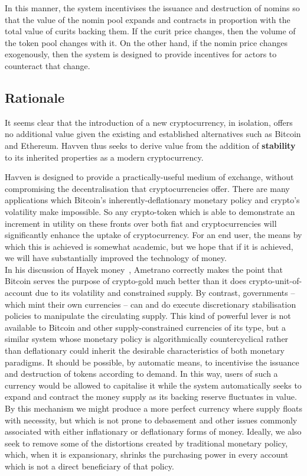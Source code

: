 In this manner, the system incentivises the issuance and destruction of nomins so that the value of
the nomin pool expands and contracts in proportion with the total value of curits backing them.
If the curit price changes, then the volume of the token pool changes with it.
On the other hand, if the nomin price changes exogenously, then the system is designed to provide
incentives for actors to counteract that change. \\

\subsection{Rationale}

It seems clear that the introduction of a new cryptocurrency, in isolation, offers no additional value given
the existing and established alternatives such as Bitcoin and Ethereum.
Havven thus seeks to derive value from the addition of \textbf{stability}
to its inherited properties as a modern cryptocurrency.

Havven is designed to provide a practically-useful medium of exchange, without compromising
the decentralisation that cryptocurrencies offer.
There are many applications which Bitcoin's inherently-deflationary monetary policy and
crypto's volatility make impossible. So any crypto-token which is able to demonstrate an increment
in utility on these fronts over both fiat and cryptocurrencies will significantly
enhance the uptake of cryptocurrency. 
For an end user, the means by which this is achieved is somewhat academic,
but we hope that if it is achieved, we will have substantially improved the technology of money. \\

\noindent  In his discussion of Hayek money~\cite{ametrano2016hayek}, Ametrano correctly makes the point that
Bitcoin serves the purpose of crypto-gold much better than it does crypto-unit-of-account due to its volatility
and constrained supply. By contrast, governments -- which mint their own currencies -- can and do execute
discretionary stabilisation policies to manipulate the circulating supply. This kind of powerful lever is not
available to Bitcoin and other supply-constrained currencies of its type, but a similar system whose monetary
policy is algorithmically countercyclical rather than deflationary could inherit the desirable characteristics
of both monetary paradigms. It should be possible, by automatic means, to incentivise the issuance and
destruction of tokens according to demand. In this way, users of such a currency would be allowed to
capitalise it while the system automatically seeks to expand and contract the money supply as its backing
reserve fluctuates in value. By this mechanism we might produce a more perfect currency where supply floats
with necessity, but which is not prone to debasement and other issues commonly associated with either
inflationary or deflationary forms of money. Ideally, we also seek to remove some of the distortions created
by traditional monetary policy, which, when it is expansionary, shrinks the purchasing power in every account
which is not a direct beneficiary of that policy.\\

